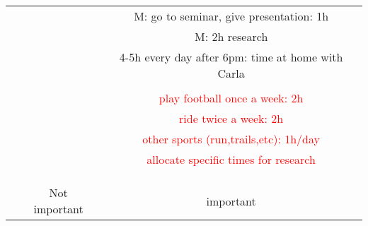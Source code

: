 \documentclass[10pt]{article}
\newcommand{\red}[1]{{\textcolor{red}{#1}}}
\begin{document}
\begin{landscape}
\begin{tabular}{c|c|c}
             &                                              &  M: go to seminar, give presentation: 1h                    \\
             &                                              &  M: 2h research                                            \\
             &                                              &  4-5h every day after 6pm: time at home with Carla          \\
             &                                              &                                                             \\
             &                                              &  \red{play football once a week: 2h}                        \\
             &                                              &  \red{ride twice a week: 2h}                                \\
             &                                              &  \red{other sports (run,trails,etc): 1h/day}                \\
             &                                              &  \red{allocate specific times for research}                 \\
             &                                              &                                                             \\
             &                                              &                                                             \\
             &                                              &                                                             \\
  \hline 
             &           Not important                      &          important 
\end{tabular}
\end{landscape} 
\end{document}
